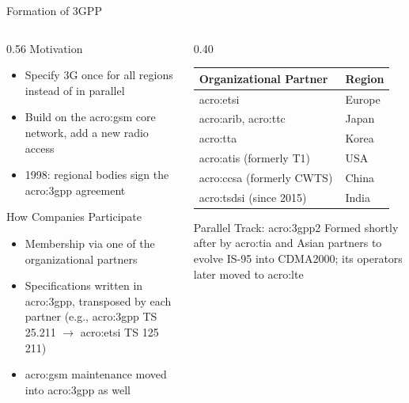 
\begin{frame}{Formation of 3GPP}
  \begin{columns}[T,onlytextwidth]
    \begin{column}{0.56\textwidth}
      Motivation
      \begin{itemize}
        \item Specify 3G once for all regions instead of in parallel
        \item Build on the \gls{acro:gsm} core network, add a new radio access
        \item 1998: regional bodies sign the \gls{acro:3gpp} agreement~\cite{3gpp-intro}
      \end{itemize}
      \vspace{0.4em}
      How Companies Participate
      \begin{itemize}
        \item Membership via one of the organizational partners
        \item Specifications written in \gls{acro:3gpp}, transposed by each partner (e.g., \gls{acro:3gpp} TS 25.211 $\rightarrow$ \gls{acro:etsi} TS 125 211)
        \item \Gls{acro:gsm} maintenance moved into \gls{acro:3gpp} as well
      \end{itemize}
    \end{column}
    \begin{column}{0.40\textwidth}
      \centering
      \footnotesize
      \begin{tabular}{ll}
        \toprule
        \textbf{Organizational Partner}~\cite{3gpp-intro} & \textbf{Region} \\
        \midrule
        \acrshort{acro:etsi} & Europe \\
        \acrshort{acro:arib}, \acrshort{acro:ttc} & Japan \\
        \acrshort{acro:tta} & Korea \\
        \acrshort{acro:atis} (formerly T1) & USA \\
        \acrshort{acro:ccsa} (formerly CWTS) & China \\
        \acrshort{acro:tsdsi} (since 2015) & India \\
        \bottomrule
      \end{tabular}

      \normalsize
      \raggedright
      \vspace{0.5em}
      \begin{block}{Parallel Track: \gls{acro:3gpp2}}
        Formed shortly after by \gls{acro:tia} and Asian partners to evolve IS-95 into CDMA2000; its operators later moved to \gls{acro:lte}
      \end{block}
    \end{column}
  \end{columns}
\end{frame}


